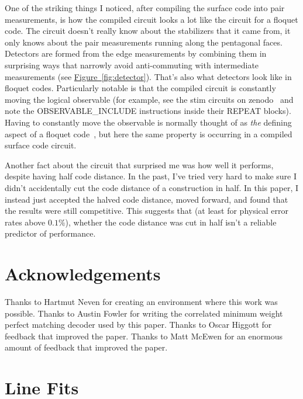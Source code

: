 \documentclass[onecolumn,unpublished,a4paper]{quantumarticle}
\theoremstyle{definition}
\theoremstyle{definition}
\theoremstyle{definition}
\newcommand{\fig}[1]{\hyperref[fig:#1]{Figure~\ref*{fig:#1}}}
\begin{document}
One of the striking things I noticed, after compiling the surface code into pair measurements, is how the compiled circuit looks a lot like the circuit for a floquet code.
The circuit doesn't really know about the stabilizers that it came from, it only knows about the pair measurements running along the pentagonal faces.
Detectors are formed from the edge measurements by combining them in surprising ways that narrowly avoid anti-commuting with intermediate measurements (see \fig{detector}).
That's also what detectors look like in floquet codes.
Particularly notable is that the compiled circuit is constantly moving the logical observable (for example, see the stim circuits on zenodo~\cite{craig_gidney_2022_6626417} and note the OBSERVABLE\_INCLUDE instructions inside their REPEAT blocks).
Having to constantly move the observable is normally thought of as \emph{the} defining aspect of a floquet code~\cite{hastings2021dynamically}, but here the same property is occurring in a compiled surface code circuit.

Another fact about the circuit that surprised me was how well it performs, despite having half code distance.
In the past, I've tried very hard to make sure I didn't accidentally cut the code distance of a construction in half.
In this paper, I instead just accepted the halved code distance, moved forward, and found that the results were still competitive.
This suggests that (at least for physical error rates above $0.1\%$), whether the code distance was cut in half isn't a reliable predictor of performance.

\section{Acknowledgements}

Thanks to Hartmut Neven for creating an environment where this work was possible.
Thanks to Austin Fowler for writing the correlated minimum weight perfect matching decoder used by this paper.
Thanks to Oscar Higgott for feedback that improved the paper.
Thanks to Matt McEwen for an enormous amount of feedback that improved the paper.





\appendix
\clearpage

\section{Line Fits}
\label{app:uncertainty}
\end{document}
